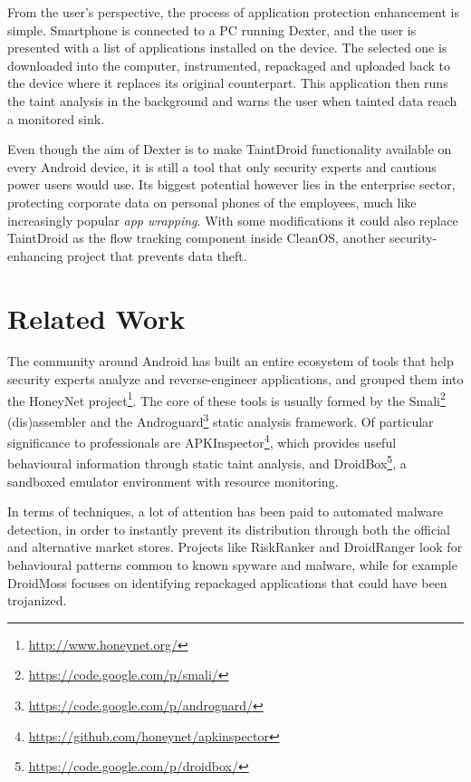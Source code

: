 \documentclass[12pt,twoside,notitlepage]{report}
\newcommand{\weblink}[1] {\footnote{\scriptsize\url{#1}}}
\begin{document}
From the user's perspective, the process of application protection enhancement is simple. Smartphone is connected to a PC running Dexter, and the user is presented with a list of applications installed on the device. The selected one is downloaded into the computer, instrumented, repackaged and uploaded back to the device where it replaces its original counterpart. This application then runs the taint analysis in the background and warns the user when tainted data reach a monitored sink.

Even though the aim of Dexter is to make TaintDroid functionality available on every Android device, it is still a tool that only security experts and cautious power users would use. Its biggest potential however lies in the enterprise sector, protecting corporate data on personal phones of the employees, much like increasingly popular \emph{app wrapping}\cite{web:AppWrapping}. With some modifications it could also replace TaintDroid as the flow tracking component inside CleanOS\cite{Tang:2012:CLM:2387880.2387888}, another security-enhancing project that prevents data theft.

\section{Related Work}

The community around Android has built an entire ecosystem of tools that help security experts analyze and reverse-engineer applications, and grouped them into the HoneyNet project\weblink{http://www.honeynet.org/}. The core of these tools is usually formed by the Smali\weblink{https://code.google.com/p/smali/} (dis)assembler and the Androguard\weblink{https://code.google.com/p/androguard/} static analysis framework. Of particular significance to professionals are APKInspector\weblink{https://github.com/honeynet/apkinspector}, which provides useful behavioural information through static taint analysis\cite{2012kim_scandal}, and DroidBox\weblink{https://code.google.com/p/droidbox/}, a sandboxed emulator environment with resource monitoring. 

In terms of techniques, a lot of attention has been paid to automated malware detection, in order to instantly prevent its distribution through both the official and alternative market stores. Projects like RiskRanker\cite{Grace:2012:RSA:2307636.2307663} and DroidRanger\cite{Yajin:12NDSS} look for behavioural patterns common to known spyware and malware, while for example DroidMoss\cite{Zhou:2012:DRS:2133601.2133640} focuses on identifying repackaged applications that could have been trojanized. 
\end{document}
